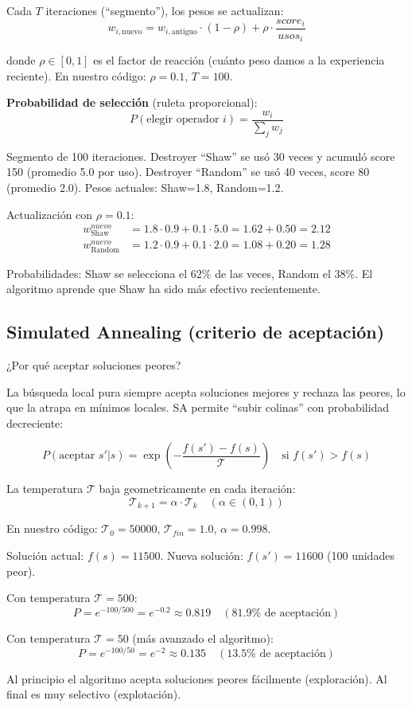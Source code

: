 \documentclass[12pt,a4paper]{article}
\begin{document}
Cada $T$ iteraciones (``segmento''), los pesos se actualizan:
$$w_{i,\text{nuevo}} = w_{i,\text{antiguo}} \cdot (1 - \rho) + \rho \cdot \frac{score_i}{usos_i}$$

donde $\rho \in [0,1]$ es el factor de reacción (cuánto peso damos a la experiencia reciente). En nuestro código: $\rho = 0.1$, $T = 100$.

\textbf{Probabilidad de selección} (ruleta proporcional):
$$P(\text{elegir operador } i) = \frac{w_i}{\sum_j w_j}$$

\begin{ejemplo}
Segmento de 100 iteraciones. Destroyer ``Shaw'' se usó 30 veces y acumuló score 150 (promedio 5.0 por uso). Destroyer ``Random'' se usó 40 veces, score 80 (promedio 2.0). Pesos actuales: Shaw=1.8, Random=1.2.

Actualización con $\rho=0.1$:
\begin{align*}
w_{\text{Shaw}}^{nuevo} &= 1.8 \cdot 0.9 + 0.1 \cdot 5.0 = 1.62 + 0.50 = 2.12 \\
w_{\text{Random}}^{nuevo} &= 1.2 \cdot 0.9 + 0.1 \cdot 2.0 = 1.08 + 0.20 = 1.28
\end{align*}

Probabilidades: Shaw se selecciona el 62\% de las veces, Random el 38\%.
El algoritmo aprende que Shaw ha sido más efectivo recientemente.
\end{ejemplo}

\subsection{Simulated Annealing (criterio de aceptación)}

\begin{pregunta}
¿Por qué aceptar soluciones peores?
\end{pregunta}

La búsqueda local pura siempre acepta soluciones mejores y rechaza las peores, lo que la atrapa en mínimos locales. SA permite ``subir colinas'' con probabilidad decreciente:

$$P(\text{aceptar } s' | s) = \exp\!\left(-\frac{f(s') - f(s)}{\mathcal{T}}\right) \quad \text{si } f(s') > f(s)$$

La temperatura $\mathcal{T}$ baja geometricamente en cada iteración:
$$\mathcal{T}_{k+1} = \alpha \cdot \mathcal{T}_k \quad (\alpha \in (0,1))$$

En nuestro código: $\mathcal{T}_0 = 50000$, $\mathcal{T}_{fin} = 1.0$, $\alpha = 0.998$.

\begin{ejemplo}
Solución actual: $f(s) = 11500$. Nueva solución: $f(s') = 11600$ (100 unidades peor).

Con temperatura $\mathcal{T} = 500$:
$$P = e^{-100/500} = e^{-0.2} \approx 0.819 \quad (81.9\% \text{ de aceptación})$$

Con temperatura $\mathcal{T} = 50$ (más avanzado el algoritmo):
$$P = e^{-100/50} = e^{-2} \approx 0.135 \quad (13.5\% \text{ de aceptación})$$

Al principio el algoritmo acepta soluciones peores fácilmente (exploración). Al final es muy selectivo (explotación).
\end{ejemplo}
\end{document}
